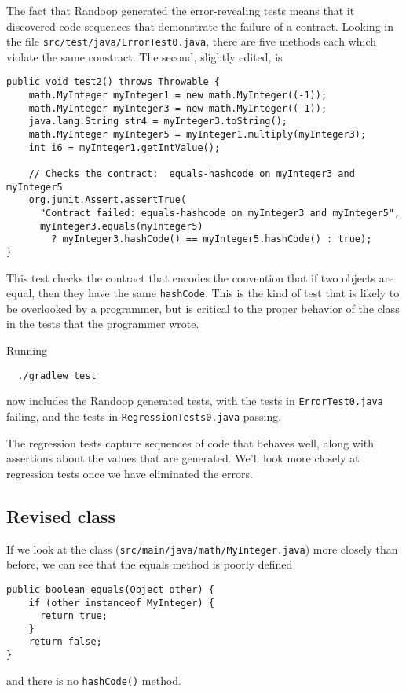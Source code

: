 \documentclass[11pt, oneside]{article} %
\newcommand{\code}[1]{{\texttt{#1}}}
\begin{document}
The fact that Randoop generated the error-revealing tests means that it discovered code sequences that demonstrate the failure of a contract.
Looking in the file \texttt{src/test/java/ErrorTest0.java}, there are five methods each which violate the same constract.
The second, slightly edited, is
\begin{verbatim}
public void test2() throws Throwable {
    math.MyInteger myInteger1 = new math.MyInteger((-1));
    math.MyInteger myInteger3 = new math.MyInteger((-1));
    java.lang.String str4 = myInteger3.toString();
    math.MyInteger myInteger5 = myInteger1.multiply(myInteger3);
    int i6 = myInteger1.getIntValue();
    
    // Checks the contract:  equals-hashcode on myInteger3 and myInteger5
    org.junit.Assert.assertTrue(
      "Contract failed: equals-hashcode on myInteger3 and myInteger5",
      myInteger3.equals(myInteger5) 
        ? myInteger3.hashCode() == myInteger5.hashCode() : true);
}
\end{verbatim}
This test checks the contract that encodes the convention that if two objects are equal, then they have the same \code{hashCode}.
This is the kind of test that is likely to be overlooked by a programmer, but is critical to the proper behavior of the class in the tests that the programmer wrote.

\vfill\pagebreak
Running 
\begin{verbatim}
  ./gradlew test
\end{verbatim}
now includes the Randoop generated tests, with the tests in \texttt{ErrorTest0.java} failing, and the tests in \texttt{RegressionTests0.java} passing.


The regression tests capture sequences of code that behaves well, along with assertions about the values that are generated. 
We'll look more closely at regression tests once we have eliminated the errors.

\subsection{Revised class}

If we look at the class (\texttt{src/main/java/math/MyInteger.java}) more closely than before, we can see that the equals method is poorly defined
\begin{verbatim}
public boolean equals(Object other) {
    if (other instanceof MyInteger) {
      return true;
    }
    return false;
}
\end{verbatim}
and there is no \code{hashCode()} method.
\end{document}
